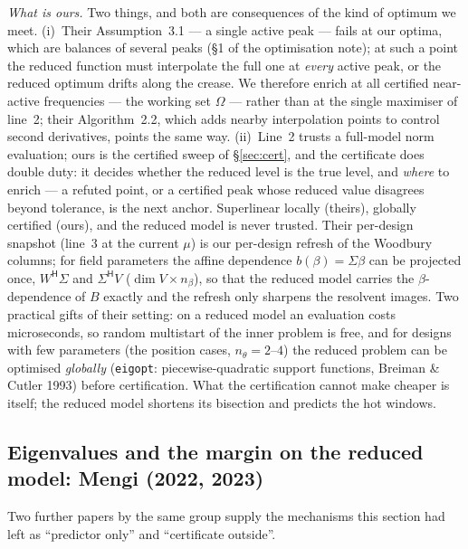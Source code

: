 \documentclass[11pt,a4paper]{article}
\newcommand{\revQ}[1]{{\color{revQ}#1}}
\newcommand{\code}[1]{\texttt{#1}}
\newcommand{\hp}{^{\mathsf H}}
\begin{document}
{{{\emph{What is ours.}  Two things, and both are consequences of the kind of optimum we
meet.  (i)~Their Assumption~3.1 --- a single active peak --- fails at our optima, which
are balances of several peaks (\S1 of the optimisation note); at such a point the
reduced function must interpolate the full one at \emph{every} active peak, or the
reduced optimum drifts along the crease.  We therefore enrich at all certified
near-active frequencies --- the working set $\Omega$ --- rather than at the single
maximiser of line~2; their Algorithm~2.2, which adds nearby interpolation points to
control second derivatives, points the same way.  (ii)~Line~2 trusts a full-model norm
evaluation; ours is the certified sweep of \S\ref{sec:cert}, and the certificate does
double duty: it decides whether the reduced level is the true level, and \emph{where} to
enrich --- a refuted point, or a certified peak whose reduced value disagrees beyond
tolerance, is the next anchor.  Superlinear locally (theirs), globally certified (ours),
and the reduced model is never trusted.  Their per-design snapshot (line~3 at the
current $\mu$) is our per-design refresh of the Woodbury columns; for field parameters
the affine dependence $b(\beta)=\Sigma\beta$ can be projected once, $W\hp\Sigma$ and
$\Sigma\hp V$ ($\dim V\times n_\beta$), so that the reduced model carries the
$\beta$-dependence of $B$ exactly and the refresh only sharpens the resolvent images.
Two practical gifts of their setting: on a reduced model an evaluation costs microseconds,
so random multistart of the inner problem is free, and for designs with few parameters
(the position cases, $n_\theta=2$--$4$) the reduced problem can be optimised
\emph{globally} (\code{eigopt}: piecewise-quadratic support functions, Breiman \& Cutler
1993) before certification.  What the certification cannot make cheaper is itself; the
reduced model shortens its bisection and predicts the hot windows.}

\revQ{\subsection{Eigenvalues and the margin on the reduced model: Mengi (2022, 2023)}
\label{sec:proj-mengi}
Two further papers by the same group supply the mechanisms this section had left as
``predictor only'' and ``certificate outside''.

}}}
\end{document}
